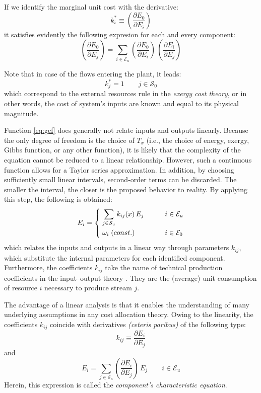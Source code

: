 \documentclass[energies,article,submit,moreauthors,pdftex]{Definitions/mdpi}
\newcommand{\dpartial}[2]{\left(\dfrac{\partial E_{#1}}{\partial E_{#2}}\right)}
\begin{document}
If we identify the marginal unit cost with the derivative:
\begin{equation}
k_i^*\equiv\dpartial{0}{i}
\end{equation}
it satisfies evidently the following expresion for each and every component:
\begin{equation}
\dpartial{0}{j}=\sum_{i\in\mathcal{E}_u}{\dpartial{0}{i}\,\dpartial{i}{j}}
\label{eq:mcost}
\end{equation}

Note that in case of the flows entering the plant, it leads:
\begin{equation}
k_{j}^{*}=1 \qquad j\in\mathcal{S}_0
\end{equation}
which correspond to the external resources rule in the \emph{exergy cost theory}, or in other words, the cost of system's inputs are known and equal to its physical magnitude. 

Function \cref{eq:gcf} does generally not relate inputs and outputs linearly. Because the only degree of freedom is the choice of $T_x$ (i.e., the choice of energy, exergy, Gibbs function, or any other function), it is likely that the complexity of the equation cannot be reduced to a linear relationship.
However, such a continuous function allows for a Taylor series approximation. In addition, by choosing sufficiently small linear intervals, second-order terms can be discarded. The smaller the interval, the closer is the proposed behavior to reality. By applying this step, the following is obtained:
\begin{equation}
    E_i=\begin{dcases}
    \;\sum\limits_{j\in\mathcal{S}_u}{k_{ij}(x)\,E_j} \qquad &i\in\mathcal{E}_u \\
    \;\omega_i\;\text(const.) \qquad &i\in\mathcal{E}_0
    \end{dcases}
    \label{eq:echar}
\end{equation}
which relates the inputs and outputs in a linear way through parameters $k_{ij}$, which substitute the internal parameters for each identified component. Furthermore, the coefficients $k_{ij}$ take the name of technical production coefficients in the input–output theory \cite{Leontief1970}. They are the (average) unit consumption of resource $i$ necessary to produce stream $j$.

The advantage of a linear analysis is that it enables the understanding of many underlying assumptions in any cost allocation theory. Owing to the linearity, the coefficients $k_{ij}$ coincide with derivatives \emph{(ceteris paribus)} of the following type:
\begin{equation}
    k_{ij}\equiv\dfrac{\partial E_{i}}{\partial E_{j}}
\end{equation}
and
\begin{equation}
    E_i=\sum_{j\in\mathcal{S}_u}{\dpartial{i}{j}\,E_j} \qquad i\in\mathcal{E}_u
\end{equation}
Herein, this expression is called the \emph{component's characteristic equation}.
\end{document}
